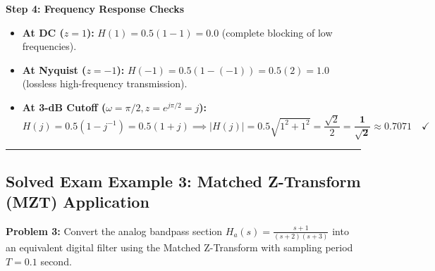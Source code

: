 \documentclass[11pt,a4paper]{article}
\begin{document}
\noindent\textbf{Step 4: Frequency Response Checks}
\begin{itemize}
    \item \textbf{At DC ($z = 1$):} $H(1) = 0.5(1 - 1) = \mathbf{0.0}$ (complete blocking of low frequencies).
    \item \textbf{At Nyquist ($z = -1$):} $H(-1) = 0.5(1 - (-1)) = 0.5(2) = \mathbf{1.0}$ (lossless high-frequency transmission).
    \item \textbf{At 3-dB Cutoff ($\omega = \pi/2, z = e^{j\pi/2} = j$):}
    \begin{equation}
    H(j) = 0.5(1 - j^{-1}) = 0.5(1 + j) \implies |H(j)| = 0.5\sqrt{1^2 + 1^2} = \frac{\sqrt{2}}{2} = \mathbf{\frac{1}{\sqrt{2}} \approx 0.7071} \quad \checkmark
    \end{equation}
\end{itemize}

\noindent\rule{\textwidth}{0.5pt}

\subsection*{Solved Exam Example 3: Matched Z-Transform (MZT) Application}

\textbf{Problem 3:} Convert the analog bandpass section $H_a(s) = \frac{s + 1}{(s + 2)(s + 3)}$ into an equivalent digital filter using the Matched Z-Transform with sampling period $T = 0.1$ second.
\end{document}
